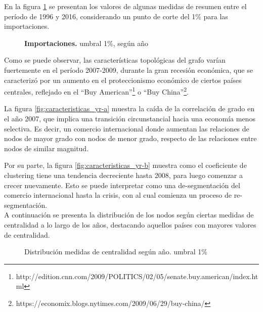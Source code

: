 \documentclass[class=article, crop=false]{standalone}
\begin{document}
En la figura \ref{fig:caracteristicas_yr} se presentan los valores de algunas medidas de resumen entre el período de 1996 y 2016, considerando un punto de corte del 1\% para las importaciones. 



\begin{figure}
\centering
{}
\caption{\textbf{Importaciones.} umbral 1\%, según año}
\label{fig:caracteristicas_yr}
\end{figure}


Como se puede observar, las características topológicas del grafo varían fuertemente en el período 2007-2009, durante la gran recesión económica, que se caracterizó por un aumento en el proteccionismo económico de ciertos países centrales, reflejado en el “Buy American”\footnote{http://edition.cnn.com/2009/POLITICS/02/05/senate.buy.american/index.html} o “Buy China”\footnote{https://economix.blogs.nytimes.com/2009/06/29/buy-china/}. 

La figura \ref{fig:caracteristicas_yr-a} muestra la caída de la correlación de grado en el año 2007, que implica una transición circunstancial hacia una economía menos selectiva. Es decir, un comercio internacional donde aumentan las relaciones de nodos de mayor grado con nodos de menor grado, respecto de las relaciones entre nodos de similar magnitud.

Por su parte, la figura \ref{fig:caracteristicas_yr-b} muestra como el coeficiente de clustering tiene una tendencia decreciente hasta 2008, para luego comenzar a crecer nuevamente. Esto se puede interpretar como una de-segmentación del comercio internacional hasta la crisis, con al cual comienza un proceso de re-segmentación. \\

A continuación se presenta la distribución de los nodos según ciertas medidas de centralidad a lo largo de los años, destacando aquellos países con mayores valores de centralidad. 


\begin{figure}
\centering
{}


%    
\caption{Distribución medidas de centralidad según año. umbral 1\%}
\label{fig:distribuciones}
\end{figure}
\end{document}
